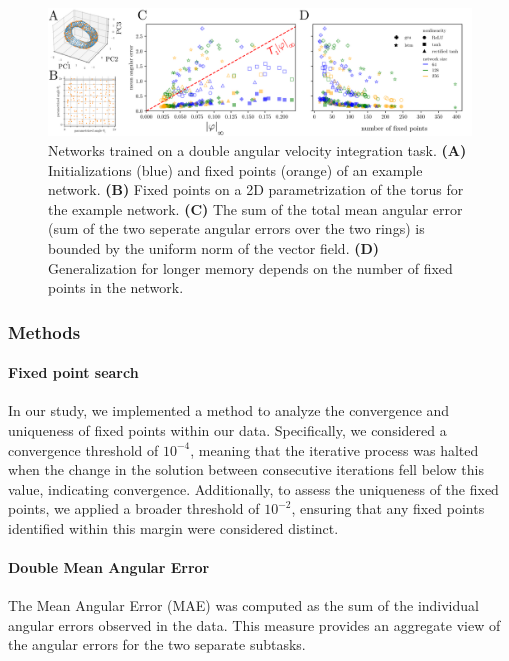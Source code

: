 \documentclass{article} %
\newcounter{ct}
\theoremstyle{definition}
\theoremstyle{remark}
\begin{document}
\begin{figure}[tbhp]
  \centering
  \includegraphics[width=\textwidth]{davit}
  \caption{%
      Networks trained on a double angular velocity integration task.
    \textbf{(A)} Initializations (blue) and fixed points (orange) of an example network.
    \textbf{(B)} Fixed points on a 2D parametrization of the torus for the example network.
    \textbf{(C)} The sum of the total mean angular error (sum of the two seperate angular errors over the two rings) is bounded by the uniform norm of the vector field.
    \textbf{(D)} Generalization for longer memory depends on the number of fixed points in the network.
}\label{fig:davit}
\end{figure}




\subsubsection{Methods}
\paragraph{Fixed point search}
In our study, we implemented a  method to analyze the convergence and uniqueness of fixed points within our data.
 Specifically, we considered a convergence threshold of \(10^{-4}\), meaning that the iterative process was halted when the change in the solution between consecutive iterations fell below this value, indicating convergence. Additionally, to assess the uniqueness of the fixed points, we applied a broader threshold of  \(10^{-2}\), ensuring that any fixed points identified within this margin were considered distinct.


\paragraph{Double Mean Angular Error}
The Mean Angular Error (MAE) was computed as the sum of the individual angular errors observed in the data.
 This measure provides an aggregate view of the angular errors for the two separate subtasks.
\end{document}
